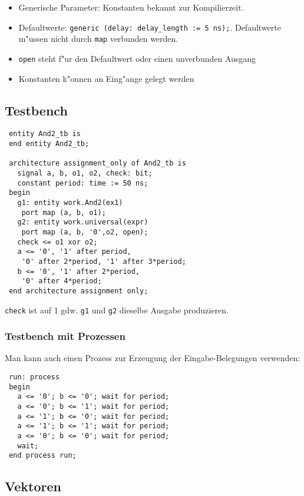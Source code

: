 \documentclass[german, 10pt, a4paper, twocolumn]{scrartcl}
\theoremstyle{definition}
\begin{document}
\begin{itemize}
	\item Generische Parameter: Konstanten bekannt zur Kompilierzeit.
	\item Defaultwerte: \texttt{generic (delay: delay\_length := 5 ns);}. Defaultwerte m"ussen nicht durch \texttt{map} verbunden werden.
	\item \texttt{open} steht f"ur den Defaultwert oder einen unverbunden Ausgang
	\item Konstanten k"onnen an Eing"ange gelegt werden
\end{itemize}

\subsection{Testbench}

\begin{verbatim}
 entity And2_tb is
 end entity And2_tb;

 architecture assignment_only of And2_tb is
   signal a, b, o1, o2, check: bit;
   constant period: time := 50 ns;
 begin
   g1: entity work.And2(ex1)
    port map (a, b, o1);
   g2: entity work.universal(expr)
    port map (a, b, '0',o2, open);
   check <= o1 xor o2;
   a <= '0', '1' after period,
    '0' after 2*period, '1' after 3*period;
   b <= '0', '1' after 2*period,
    '0' after 4*period;
 end architecture assignment only;
\end{verbatim}

\texttt{check} ist auf 1 gdw. \texttt{g1} und \texttt{g2} dieselbe Ausgabe produzieren.

\subsubsection{Testbench mit Prozessen}

Man kann auch einen Prozess zur Erzeugung der Eingabe-Belegungen verwenden:

\begin{verbatim}
 run: process
 begin
   a <= '0'; b <= '0'; wait for period;
   a <= '0'; b <= '1'; wait for period;
   a <= '1'; b <= '0'; wait for period;
   a <= '1'; b <= '1'; wait for period;
   a <= '0'; b <= '0'; wait for period;
   wait;
 end process run;
\end{verbatim}

\subsection{Vektoren}
\end{document}
